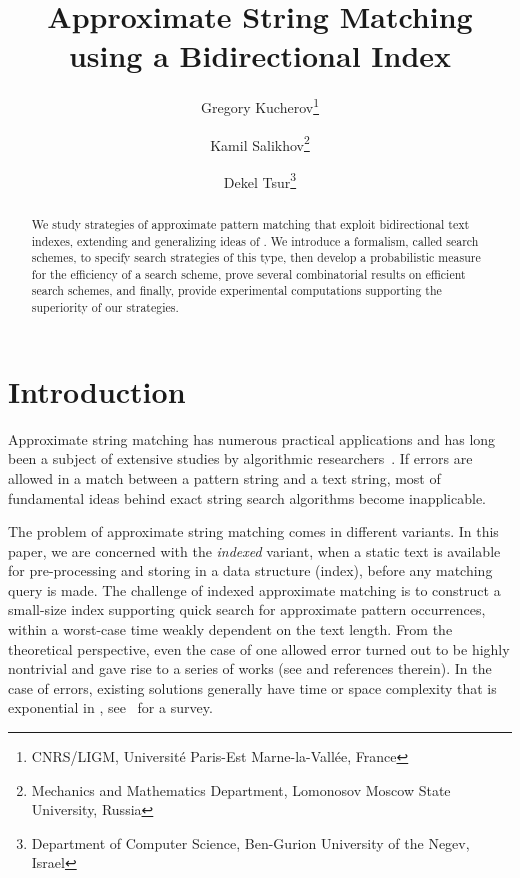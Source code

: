 \documentclass[12pt]{article}
\begin{document}
\title{Approximate String Matching using a Bidirectional Index}
\author{
Gregory Kucherov\thanks{CNRS/LIGM, Universit\'e Paris-Est Marne-la-Vall\'ee, France}
\and
Kamil Salikhov\thanks{Mechanics and Mathematics Department, Lomonosov Moscow State University, Russia}
\and
Dekel Tsur\thanks{Department of Computer Science, Ben-Gurion University of
the Negev, Israel}
}
\date{}
\maketitle

\begin{abstract}
We study strategies of approximate pattern matching that exploit
bidirectional text indexes, extending and generalizing ideas of
\cite{LamLTWWY09}. We introduce a formalism, called search schemes, to specify search strategies of
this type, then develop a probabilistic measure for the efficiency of
a search scheme, prove several combinatorial results on efficient
search schemes, and finally, provide experimental computations
supporting the superiority of our strategies. 
\end{abstract}

\section{Introduction}

Approximate
string matching has numerous practical applications and has long been a subject of extensive studies by 
algorithmic researchers~\cite{Navarro:2001:GTA:375360.375365}. If errors are allowed in a
match between a pattern string and a text string, most of
fundamental ideas behind exact string search algorithms become
inapplicable.

The problem of approximate string matching comes in
different variants. In this paper, we are concerned with the
\emph{indexed} variant, when a static text is available for
pre-processing and storing in a data structure (index), before any matching
query is made. 
The 
challenge of indexed approximate matching is to construct a small-size
index supporting quick search for approximate 
pattern occurrences, within a worst-case time weakly dependent on the text
length. 
From the theoretical perspective, 
even the case of one allowed error turned out to be
highly nontrivial and gave rise to a series of works (see
\cite{LamSW05} and references therein). In the case of  errors,
existing solutions generally have time or space complexity that is exponential
in , see~\cite{SungEncyclopedia08} for a survey.
\end{document}
